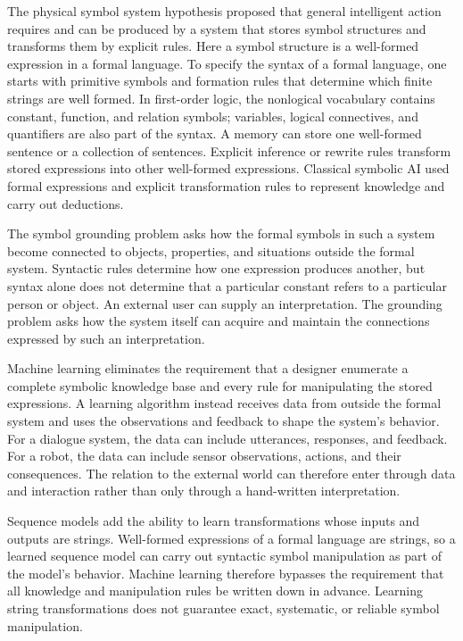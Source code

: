 \documentclass[11pt,twoside]{article}
\theoremstyle{definition}
\theoremstyle{remark}
\begin{document}
The physical symbol system hypothesis proposed that general intelligent
action requires and can be produced by a system that stores symbol structures
and transforms them by explicit rules. Here a symbol structure is a
well-formed expression in a formal language. To specify the syntax of a formal
language, one starts with primitive symbols and formation rules that determine
which finite strings are well formed. In first-order logic, the nonlogical
vocabulary contains constant, function, and relation symbols; variables,
logical connectives, and quantifiers are also part of the syntax. A memory can
store one well-formed sentence or a collection of sentences. Explicit
inference or rewrite rules transform stored expressions into other
well-formed expressions. Classical symbolic AI used formal expressions and
explicit transformation rules to represent knowledge and carry out deductions.

The symbol grounding problem asks how the formal symbols in such a system
become connected to objects, properties, and situations outside the formal
system. Syntactic rules determine how one expression produces another, but
syntax alone does not determine that a particular constant refers to a
particular person or object. An external user can supply an interpretation.
The grounding problem asks how the system itself can acquire and maintain the
connections expressed by such an interpretation.

Machine learning eliminates the requirement that a designer enumerate a
complete symbolic knowledge base and every rule for manipulating the stored
expressions. A learning algorithm instead receives data from outside the
formal system and uses the observations and feedback to shape the system's
behavior. For a dialogue system, the data can include utterances, responses,
and feedback. For a robot, the data
can include sensor observations, actions, and their consequences. The
relation to the external world can therefore enter through data and
interaction rather than only through a hand-written interpretation.

Sequence models add the ability to learn transformations whose inputs and
outputs are strings. Well-formed expressions of a formal language are strings,
so a learned sequence model can carry out syntactic symbol manipulation as
part of the model's behavior. Machine learning therefore bypasses the
requirement that all knowledge and manipulation rules be written down in
advance. Learning string transformations does not guarantee exact,
systematic, or reliable symbol manipulation.
\end{document}
